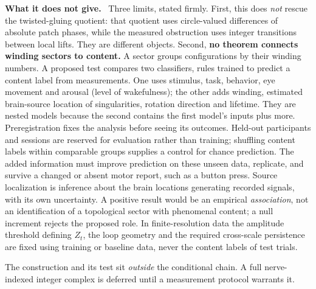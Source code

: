 \documentclass[11pt]{article}
\newcommand{\scope}{\par\smallskip\noindent\textbf{What it does not give.}\ }
\begin{document}
\scope
Three limits, stated firmly. First, this does \emph{not} rescue the twisted-gluing
quotient: that quotient uses circle-valued differences of absolute patch
phases, while the measured obstruction uses integer transitions between local
lifts. They are different objects. Second, \textbf{no theorem connects winding
sectors to content.} A sector groups configurations by their winding numbers.
A proposed test compares two classifiers, rules trained to predict a content
label from measurements. One uses stimulus, task, behavior, eye movement and
arousal (level of wakefulness); the other adds winding, estimated brain-source
location of singularities, rotation direction and lifetime. They are nested
models because the second contains the first model's inputs plus more.
Preregistration fixes the analysis before seeing its outcomes. Held-out
participants and sessions are reserved for evaluation rather than training;
shuffling content labels within comparable groups supplies a control for chance
prediction. The added information must improve prediction on these unseen
data, replicate, and survive a changed or absent motor report, such as a button
press. Source localization is inference about the brain locations generating
recorded signals, with its own uncertainty. A positive
result would be an empirical \emph{association}, not an identification of a
topological sector with phenomenal content; a null increment rejects the
proposed role. In finite-resolution data the amplitude threshold defining
$Z_t$, the loop geometry and the required cross-scale persistence are fixed
using training or baseline data, never the content labels of test trials.

The construction and its test sit \emph{outside} the conditional chain. A full
nerve-indexed integer complex is deferred until a measurement protocol warrants
it.
\end{document}
